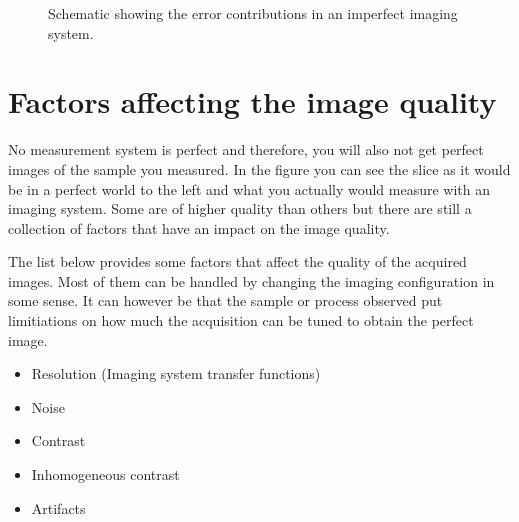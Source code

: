 \documentclass[letterpaper,10pt,english]{sphinxmanual}
\begin{document}
\begin{figure}[htbp]
\centering
\capstart

\noindent{}
\caption{Schematic showing the error contributions in an imperfect imaging system.}\label{\detokenize{02-ImageEnhancement:id4}}\end{figure}


\section{Factors affecting the image quality}
\label{\detokenize{02-ImageEnhancement:factors-affecting-the-image-quality}}
\sphinxAtStartPar
No measurement system is perfect and therefore, you will also not get perfect images of the sample you measured. In the figure you can see the slice as it would be in a perfect world to the left and what you actually would measure with an imaging system. Some are of higher quality than others but there are still a collection of factors that have an impact on the image quality.

\sphinxAtStartPar
The list below provides some factors that affect the quality of the acquired images. Most of them can be handled by changing the imaging configuration in some sense. It can however be that the sample or process observed put limitiations on how much the acquisition can be tuned to obtain the perfect image.
\begin{itemize}
\item {} 
\sphinxAtStartPar
Resolution (Imaging system transfer functions)

\item {} 
\sphinxAtStartPar
Noise

\item {} 
\sphinxAtStartPar
Contrast

\item {} 
\sphinxAtStartPar
Inhomogeneous contrast

\item {} 
\sphinxAtStartPar
Artifacts

\end{itemize}
\end{document}
